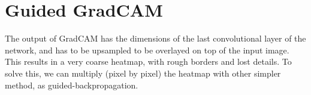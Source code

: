 \section{Guided GradCAM}

The output of GradCAM has the dimensions of the last convolutional layer of the network, and has to be upsampled to be overlayed on top of the input image. This results in a very coarse heatmap, with rough borders and lost details. To solve this, we can multiply (pixel by pixel) the heatmap with other simpler method, as guided-backpropagation. 


